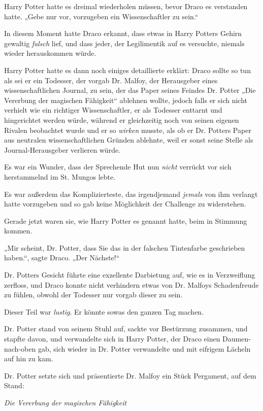 {Harry Potter hatte es dreimal wiederholen müssen, bevor Draco es verstanden hatte. „Gebe nur vor, vorzugeben ein Wissenschaftler zu sein.“

In diesem Moment hatte Draco erkannt, dass etwas in Harry Potters Gehirn gewaltig \emph{falsch} lief, und dass jeder, der Legilimentik auf es versuchte, niemals wieder herauskommen würde.

Harry Potter hatte es dann noch einiges detaillierte erklärt: Draco sollte so tun als sei er ein Todesser, der vorgab Dr. Malfoy, der Herausgeber eines wissenschaftlichen Journal, zu sein, der das Paper seines Feindes Dr. Potter „Die Vererbung der magischen Fähigkeit“ ablehnen wollte, jedoch falls er sich nicht verhielt wie ein richtiger Wissenschaftler, er als Todesser enttarnt und hingerichtet werden würde, während er gleichzeitig noch von seinen eigenen Rivalen beobachtet wurde und er so \emph{wirken} musste, als ob er Dr. Potters Paper aus neutralen wissenschaftlichen Gründen ablehnte, weil er sonst seine Stelle als Journal-Herausgeber verlieren würde.

Es war ein Wunder, dass der Sprechende Hut nun \emph{nicht} verrückt vor sich herstammelnd im St. Mungos lebte.

Es war außerdem das Komplizierteste, das irgendjemand \emph{jemals} von ihm verlangt hatte vorzugeben und so gab keine Möglichkeit der Challenge zu widerstehen.

Gerade jetzt waren sie, wie Harry Potter es genannt hatte, beim in Stimmung kommen.

„Mir scheint, Dr. Potter, dass Sie das in der falschen Tintenfarbe geschrieben haben.“, sagte Draco. „Der Nächste!“

Dr. Potters Gesicht führte eine exzellente Darbietung auf, wie es in Verzweiflung zerfloss, und Draco konnte nicht verhindern etwas von Dr. Malfoys Schadenfreude zu fühlen, obwohl der Todesser nur vorgab dieser zu sein.

Dieser Teil war \emph{lustig}. Er könnte sowas den ganzen Tag machen.

Dr. Potter stand von seinem Stuhl auf, sackte vor Bestürzung zusammen, und stapfte davon, und verwandelte sich in Harry Potter, der Draco einen Daumen-nach-oben gab, sich wieder in Dr. Potter verwandelte und mit eifrigem Lächeln auf hin zu kam.

Dr. Potter setzte sich und präsentierte Dr. Malfoy ein Stück Pergament, auf dem Stand:

\emph{Die Vererbung der magischen Fähigkeit}

}
